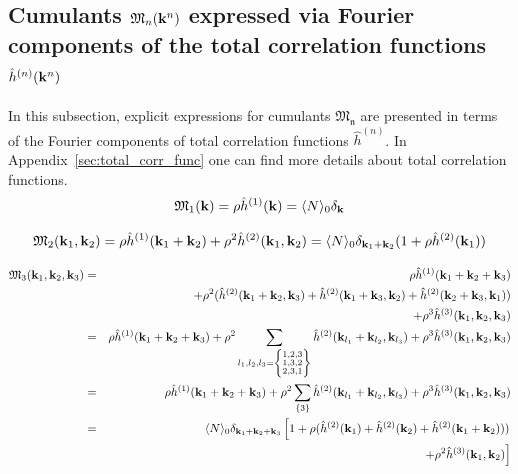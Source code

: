 \subsection{\label{sec:cumulants_via_h} Cumulants $\mathfrak M_n(\vb k^n)$ expressed via Fourier components of the total correlation functions $\hat{h}^{(n)}(\vb k^n)$}
In this subsection, explicit expressions for cumulants $\mathfrak{M_n}$ are presented in terms of the Fourier components of total correlation functions $\hat{h}^{(n)}$. In Appendix~\ref{sec:total_corr_func} one can find more details about total correlation functions.
\begin{equation}
\label{CumulantM1}
	\mathfrak M_1(\vb k) = \rho \hat{h}^{(1)}(\vb k) = \langle N \rangle_0 \delta_{\vb k}
\end{equation}

\begin{equation}
	\label{CumulantM2}
	\mathfrak M_2(\vb k_1, \vb k_2) = \rho \hat{h}^{(1)}(\vb k_1 + \vb k_2) + \rho^2\hat{h}^{(2)}(\vb k_1, \vb k_2) = \langle N \rangle_0 \delta_{\vb k_1 + \vb k_2} (1 + \rho \hat{h}^{(2)}(\vb k_1))
\end{equation}

\begin{eqnarray}
	\label{CumulantM3}
	\mathfrak M_3 (\vb k_1, \vb k_2, \vb k_3) &=& \rho \hat{h}^{(1)}(\vb k_1 + \vb k_2 + \vb k_3) \nonumber \\
	&&+ \rho^2(\hat{h}^{(2)}(\vb k_1 + \vb k_2, \vb k_3) + \hat{h}^{(2)}(\vb k_1 + \vb k_3, \vb k_2) + \hat{h}^{(2)}(\vb k_2 + \vb k_3, \vb k_1))  \nonumber \\
	&&+ \rho^3 \hat{h}^{(3)}(\vb k_1, \vb k_2, \vb k_3) 
	\nonumber \\
	&=& \rho \hat{h}^{(1)}(\vb k_1 + \vb k_2 + \vb k_3) + 
	\rho^2 \sum_{l_1,l_2,l_3=\left\{ \substack{1,2,3 \\ 1,3,2 \\ 2,3,1}
 		\right\}}
	\hat{h}^{(2)}(\vb k_{l_1} + \vb k_{l_2}, \vb k_{l_3})
	+ \rho^3 \hat{h}^{(3)}(\vb k_1, \vb k_2, \vb k_3)
	\nonumber \\
	&=& \rho \hat{h}^{(1)}(\vb k_1 + \vb k_2 + \vb k_3) + 
	\rho^2 \sum_{\left\{3 \right\}}
	\hat{h}^{(2)}(\vb k_{l_1} + \vb k_{l_2}, \vb k_{l_3})
	+ \rho^3 \hat{h}^{(3)}(\vb k_1, \vb k_2, \vb k_3)
	\nonumber \\
	&=& \langle N \rangle_0 \delta_{\vb k_1 + \vb k_2 + \vb k_3} 
	\left[ 1 + \rho(\hat{h}^{(2)}(\vb k_1) + \hat{h}^{(2)}(\vb k_2) + \hat{h}^{(2)}(\vb k_1 + \vb k_2)) )\right. \nonumber\\
	&& \left. + \rho^2 \hat{h}^{(3)}(\vb k_1, \vb k_2) \right]
\end{eqnarray}

